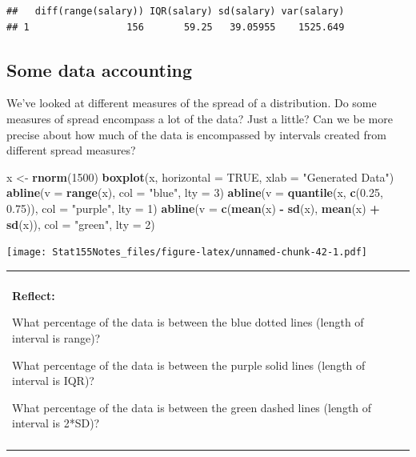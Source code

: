 \documentclass[]{book}
\newenvironment{Shaded}{\begin{snugshade}}{\end{snugshade}}
\newcommand{\DataTypeTok}[1]{\textcolor[rgb]{0.13,0.29,0.53}{#1}}
\newcommand{\DecValTok}[1]{\textcolor[rgb]{0.00,0.00,0.81}{#1}}
\newcommand{\FloatTok}[1]{\textcolor[rgb]{0.00,0.00,0.81}{#1}}
\newcommand{\KeywordTok}[1]{\textcolor[rgb]{0.13,0.29,0.53}{\textbf{#1}}}
\newcommand{\NormalTok}[1]{#1}
\newcommand{\OperatorTok}[1]{\textcolor[rgb]{0.81,0.36,0.00}{\textbf{#1}}}
\newcommand{\OtherTok}[1]{\textcolor[rgb]{0.56,0.35,0.01}{#1}}
\newcommand{\StringTok}[1]{\textcolor[rgb]{0.31,0.60,0.02}{#1}}
\newenvironment{reflect}
{
    \begin{center}
    
    \begin{tabular}{|p{0.8\textwidth}|}
    \rowcolor{LightBlue}
    \hline\\
    \rowcolor{LightBlue}
    \textbf{Reflect:}
}
{
    \\\rowcolor{LightBlue}
    \\\hline
    \end{tabular} 
    \end{center}
}
\begin{document}
\begin{verbatim}
##   diff(range(salary)) IQR(salary) sd(salary) var(salary)
## 1                 156       59.25   39.05955    1525.649
\end{verbatim}

\hypertarget{intro-zscore}{%
\subsection{Some data accounting}\label{intro-zscore}}

We've looked at different measures of the spread of a distribution. Do some measures of spread encompass a lot of the data? Just a little? Can we be more precise about how much of the data is encompassed by intervals created from different spread measures?

\begin{Shaded}
\begin{Highlighting}[]
\NormalTok{x <-}\StringTok{ }\KeywordTok{rnorm}\NormalTok{(}\DecValTok{1500}\NormalTok{)}
\KeywordTok{boxplot}\NormalTok{(x, }\DataTypeTok{horizontal =} \OtherTok{TRUE}\NormalTok{, }\DataTypeTok{xlab =} \StringTok{"Generated Data"}\NormalTok{)}
\KeywordTok{abline}\NormalTok{(}\DataTypeTok{v =} \KeywordTok{range}\NormalTok{(x), }\DataTypeTok{col =} \StringTok{"blue"}\NormalTok{, }\DataTypeTok{lty =} \DecValTok{3}\NormalTok{)}
\KeywordTok{abline}\NormalTok{(}\DataTypeTok{v =} \KeywordTok{quantile}\NormalTok{(x, }\KeywordTok{c}\NormalTok{(}\FloatTok{0.25}\NormalTok{, }\FloatTok{0.75}\NormalTok{)), }\DataTypeTok{col =} \StringTok{"purple"}\NormalTok{, }\DataTypeTok{lty =} \DecValTok{1}\NormalTok{)}
\KeywordTok{abline}\NormalTok{(}\DataTypeTok{v =} \KeywordTok{c}\NormalTok{(}\KeywordTok{mean}\NormalTok{(x) }\OperatorTok{-}\StringTok{ }\KeywordTok{sd}\NormalTok{(x), }\KeywordTok{mean}\NormalTok{(x) }\OperatorTok{+}\StringTok{ }\KeywordTok{sd}\NormalTok{(x)), }\DataTypeTok{col =} \StringTok{"green"}\NormalTok{, }\DataTypeTok{lty =} \DecValTok{2}\NormalTok{)}
\end{Highlighting}
\end{Shaded}

\texttt{[image: Stat155Notes\_files/figure-latex/unnamed-chunk-42-1.pdf]}

\begin{reflect}
What percentage of the data is between the blue dotted lines (length of
interval is range)?

What percentage of the data is between the purple solid lines (length of
interval is IQR)?

What percentage of the data is between the green dashed lines (length of
interval is 2*SD)?
\end{reflect}
\end{document}
